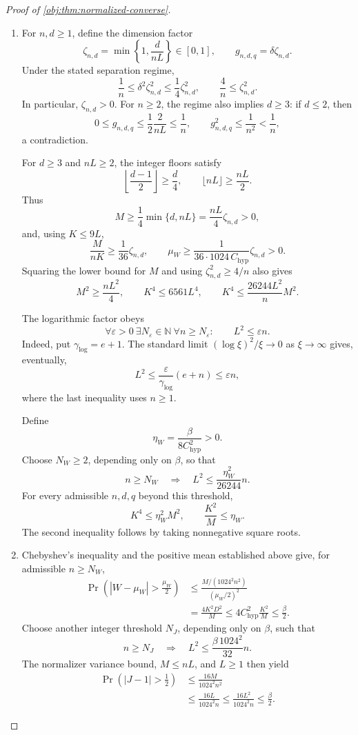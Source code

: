 \begin{proof}[Proof of \cref{obj:thm:normalized-converse}]
\begin{enumerate}
\item
For \(n,d\ge1\), define the dimension factor
\[
\zeta_{n,d}
=\min\left\{1,\frac d{nL}\right\}\in[0,1],
\qquad
g_{n,d,q}=\delta\zeta_{n,d}.
\]
Under the stated separation regime,
\[
\frac1n\le\delta^2\zeta_{n,d}^2
\le\frac14\zeta_{n,d}^2,
\qquad
\frac4n\le\zeta_{n,d}^2.
\]
In particular, \(\zeta_{n,d}>0\). For \(n\ge2\), the regime also implies \(d\ge3\): if \(d\le2\), then
\[
0\le g_{n,d,q}
\le\frac12\frac2{nL}\le\frac1n,
\qquad
g_{n,d,q}^2\le\frac1{n^2}<\frac1n,
\]
a contradiction.

For \(d\ge3\) and \(nL\ge2\), the integer floors satisfy
\[
\left\lfloor\frac{d-1}{2}\right\rfloor\ge\frac d4,
\qquad
\lfloor nL\rfloor\ge\frac{nL}{2}.
\]
Thus
\[
M\ge\frac14\min\{d,nL\}
=\frac{nL}{4}\zeta_{n,d}>0,
\]
and, using \(K\le9L\),
\[
\frac{M}{nK}\ge\frac1{36}\zeta_{n,d},
\qquad
\mu_W\ge
\frac1{36\cdot1024\,C_{\mathrm{hyp}}}\zeta_{n,d}>0.
\]
Squaring the lower bound for \(M\) and using
\(\zeta_{n,d}^2\ge4/n\) also gives
\[
M^2\ge\frac{nL^2}{4},
\qquad
K^4\le6561L^4,
\qquad
K^4\le\frac{26244L^2}{n}M^2.
\]

The logarithmic factor obeys
\[
\forall\varepsilon>0\ \exists N_\varepsilon\in\mathbb N\
\forall n\ge N_\varepsilon:
\qquad L^2\le\varepsilon n.
\]
Indeed, put \(\gamma_{\log}=e+1\). The standard limit
\((\log \xi)^2/\xi\to0\) as \(\xi\to\infty\) gives, eventually,
\[
L^2\le\frac{\varepsilon}{\gamma_{\log}}(e+n)
\le\varepsilon n,
\]
where the last inequality uses \(n\ge1\).

Define
\[
\eta_W=\frac{\beta}{8C_{\mathrm{hyp}}^2}>0.
\]
Choose \(N_W\ge2\), depending only on \(\beta\), so that
\[
n\ge N_W
\quad\Longrightarrow\quad
L^2\le\frac{\eta_W^2}{26244}n.
\]
For every admissible \(n,d,q\) beyond this threshold,
\[
K^4\le\eta_W^2M^2,
\qquad
\frac{K^2}{M}\le\eta_W.
\]
The second inequality follows by taking nonnegative square roots.

\item
Chebyshev's inequality and the positive mean established above give, for admissible \(n\ge N_W\),
\[
\begin{aligned}
\Pr\left(|W-\mu_W|>\frac{\mu_W}{2}\right)
&\le
\frac{M/(1024^2n^2)}{(\mu_W/2)^2}\\
&=\frac{4K^2D^2}{M}
\le4C_{\mathrm{hyp}}^2\frac{K^2}{M}
\le\frac\beta2.
\end{aligned}
\]
Choose another integer threshold \(N_J\), depending only on \(\beta\), such that
\[
n\ge N_J
\quad\Longrightarrow\quad
L^2\le\frac{\beta\,1024^2}{32}n.
\]
The normalizer variance bound, \(M\le nL\), and \(L\ge1\) then yield
\[
\begin{aligned}
\Pr\left(|J-1|>\frac12\right)
&\le\frac{16M}{1024^2n^2}\\
&\le\frac{16L}{1024^2n}
\le\frac{16L^2}{1024^2n}
\le\frac\beta2.
\end{aligned}
\]


\end{enumerate}
\end{proof}
